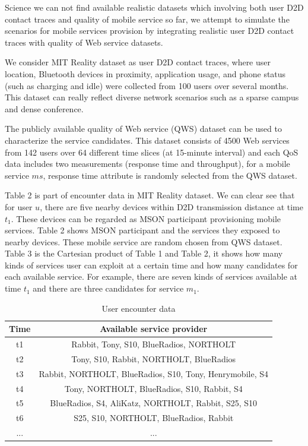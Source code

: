 \documentclass[10pt,journal,compsoc]{IEEEtran}
\begin{document}
Science we can not find available realistic datasets which involving both user D2D contact traces and quality of mobile service so far, we attempt to simulate the scenarios for mobile services provision by integrating realistic user D2D contact traces with quality of Web service datasets. 

We consider MIT Reality dataset as user D2D contact traces, where user location, Bluetooth devices in proximity, application usage, and phone status (such as charging and idle) were collected from 100 users over several months. This dataset can really reflect diverse network scenarios such as a sparse campus and dense conference.

The publicly available quality of Web service (QWS) dataset\cite{zheng2014investigating} can be used to characterize the service candidates. This dataset consists of 4500 Web services from 142 users over 64 different time slices (at 15-minute interval) and each QoS data includes two measurements (response time and throughput), for a mobile service $ms$, response time attribute is randomly selected from the QWS dataset. 

Table 2 is part of encounter data in MIT Reality dataset. We can clear see that for user $u$, there are five nearby devices within D2D transmission distance at time $t_1$. These devices can be regarded as MSON participant provisioning mobile services. Table 2 shows MSON participant and the services they exposed to nearby devices. These mobile service are random chosen from QWS dataset. Table 3 is the Cartesian product of Table 1 and Table 2, it shows how many kinds of services user can exploit at a certain time and how many candidates for each available service. For example, there are seven kinds of services available at time $t_1$ and there are three candidates for service $m_1$.

\begin{table}[!t]
\renewcommand{\arraystretch}{1.3}
\caption{User encounter data}
\label{table_example}
\centering
\begin{tabular}{|c||c|}
\hline
\bfseries Time & \bfseries Available service provider\\
\hline
\hline
t1 & Rabbit, Tony, S10, BlueRadios, NORTHOLT\\
\hline
t2 & Tony, S10, Rabbit, NORTHOLT, BlueRadios\\
\hline
t3 & Rabbit, NORTHOLT, BlueRadios, S10, Tony, Henrymobile, S4 \\
\hline
t4 & Tony, NORTHOLT, BlueRadios, S10, Rabbit, S4\\
\hline
t5 & BlueRadios, S4, AliKatz, NORTHOLT, Rabbit, S25, S10\\
\hline
t6 & S25, S10, NORTHOLT, BlueRadios, Rabbit\\
\hline
... & ...\\
\hline
\end{tabular}
\end{table}
\end{document}
